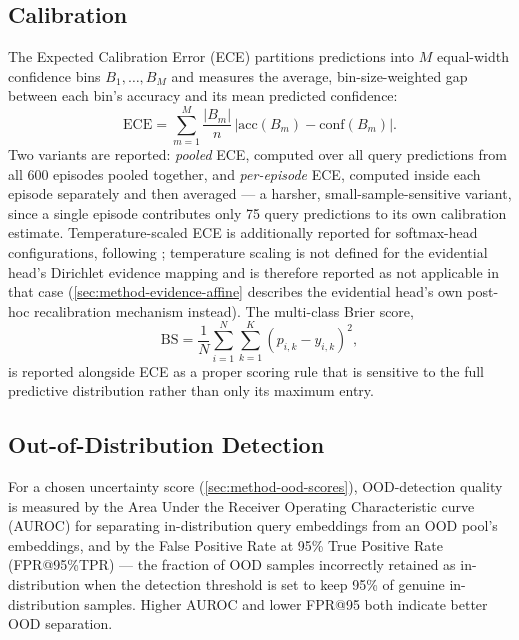 \documentclass{iutbscthesis}
\begin{document}
\subsection{Calibration}

The Expected Calibration Error (ECE) partitions predictions into $M$ equal-width confidence bins $B_1, \dots, B_M$ and measures the average, bin-size-weighted gap between each bin's accuracy and its mean predicted confidence:
\begin{equation}
    \mathrm{ECE} = \sum_{m=1}^{M} \frac{|B_m|}{n} \, \left| \mathrm{acc}(B_m) - \mathrm{conf}(B_m) \right|.
    \label{eq:ece}
\end{equation}
Two variants are reported: \emph{pooled} ECE, computed over all query predictions from all 600 episodes pooled together, and \emph{per-episode} ECE, computed inside each episode separately and then averaged — a harsher, small-sample-sensitive variant, since a single episode contributes only 75 query predictions to its own calibration estimate. Temperature-scaled ECE is additionally reported for softmax-head configurations, following \textcite{guo2017calibration}; temperature scaling is not defined for the evidential head's Dirichlet evidence mapping and is therefore reported as not applicable in that case (\autoref{sec:method-evidence-affine} describes the evidential head's own post-hoc recalibration mechanism instead). The multi-class Brier score,
\begin{equation}
    \mathrm{BS} = \frac{1}{N} \sum_{i=1}^{N} \sum_{k=1}^{K} \left( p_{i,k} - y_{i,k} \right)^2,
    \label{eq:brier}
\end{equation}
is reported alongside ECE as a proper scoring rule that is sensitive to the full predictive distribution rather than only its maximum entry.

\subsection{Out-of-Distribution Detection}

For a chosen uncertainty score (\autoref{sec:method-ood-scores}), OOD-detection quality is measured by the Area Under the Receiver Operating Characteristic curve (AUROC) for separating in-distribution query embeddings from an OOD pool's embeddings, and by the False Positive Rate at 95\% True Positive Rate (FPR@95\%TPR) — the fraction of OOD samples incorrectly retained as in-distribution when the detection threshold is set to keep 95\% of genuine in-distribution samples. Higher AUROC and lower FPR@95 both indicate better OOD separation.
\end{document}
